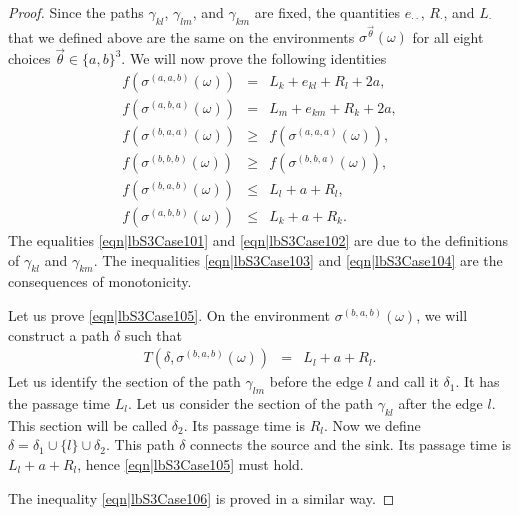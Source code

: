 \documentclass[10pt,a4paper]{amsart}
\begin{document}
\begin{proof}
Since the paths $\gamma_{kl}$, $\gamma_{lm}$, and $\gamma_{km}$ are fixed, the quantities $e_{\cdot\cdot}$, $R_{\cdot}$, and $L_{\cdot}$ that we defined 
above are the same on the environments $\sigma^{\overrightarrow{\theta}}(\omega)$ for all eight choices $\overrightarrow \theta \in\{a,b\}^3$.
We will now prove the following identities
\begin{eqnarray}
f(\sigma^{(a,a,b)}(\omega))&=&L_k+e_{kl}+R_l+2a,\label{eqn|lbS3Case101}\\
f(\sigma^{(a,b,a)}(\omega))&=&L_m+e_{km}+R_k+2a,\label{eqn|lbS3Case102}\\
f(\sigma^{(b,a,a)}(\omega))&\geq& f(\sigma^{(a,a,a)}(\omega)),\label{eqn|lbS3Case103}\\
f(\sigma^{(b,b,b)}(\omega))&\geq& f(\sigma^{(b,b,a)}(\omega)),\label{eqn|lbS3Case104}\\
f(\sigma^{(b,a,b)}(\omega))&\leq& L_l+a+R_l,\label{eqn|lbS3Case105}\\
f(\sigma^{(a,b,b)}(\omega))&\leq& L_k+a+R_k.\label{eqn|lbS3Case106}
\end{eqnarray}
The equalities \eqref{eqn|lbS3Case101} and \eqref{eqn|lbS3Case102} are due to the definitions of $\gamma_{kl}$ and $\gamma_{km}$. The inequalities \eqref{eqn|lbS3Case103} and 
\eqref{eqn|lbS3Case104} are the consequences of monotonicity. 


Let us prove \eqref{eqn|lbS3Case105}. On the environment $\sigma^{(b,a,b)}(\omega)$, we
will construct a path $\delta$ such that 
\begin{eqnarray*}T(\delta, \sigma^{(b,a,b)}(\omega)) &=& L_l+a+R_l.
\end{eqnarray*}
Let us identify the section of the path $\gamma_{lm}$ before the edge $l$ and call it $\delta_1$. 
It has the passage time $L_l$. Let us consider the section of the path $\gamma_{kl}$ after the edge $l$. 
This section will be called $\delta_2$. Its passage time is $R_l$. 
Now we define $\delta=\delta_1\cup\{l\}\cup \delta_2$. This path $\delta$ connects the source and the sink. Its passage time is $L_l+a+R_l$, hence \eqref{eqn|lbS3Case105} must hold. 

The inequality \eqref{eqn|lbS3Case106} is proved in a similar way.


\end{proof}
\end{document}
